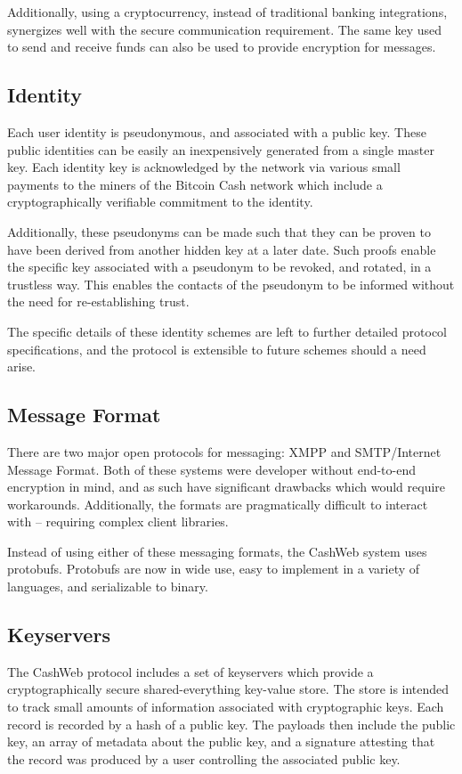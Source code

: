 \documentclass{article}
\theoremstyle{definition}
\begin{document}
Additionally, using a cryptocurrency, instead of traditional banking integrations, synergizes well with the secure communication requirement. The same key used to send and receive funds can also be used to provide encryption for messages.

\subsection{Identity}
Each user identity is pseudonymous, and associated with a public key.  These public identities can be easily an inexpensively generated from a single master key. Each identity key is acknowledged by the network via various small payments to the miners of the Bitcoin Cash network which include a cryptographically verifiable commitment to the identity.

Additionally, these pseudonyms can be made such that they can be proven to have been derived from another hidden key at a later date. Such proofs enable the specific key associated with a pseudonym to be revoked, and rotated, in a trustless way. This enables the contacts of the pseudonym to be informed without the need for re-establishing trust.

The specific details of these identity schemes are left to further detailed protocol specifications, and the protocol is extensible to future schemes should a need arise.

\subsection{Message Format}
There are two major open protocols for messaging: XMPP and SMTP/Internet Message Format. Both of these systems were developer without end-to-end encryption in mind, and as such have significant drawbacks which would require workarounds. Additionally, the formats are  pragmatically difficult to interact with -- requiring complex client libraries.

Instead of using either of these messaging formats, the CashWeb system uses protobufs. Protobufs are now in wide use, easy to implement in a variety of languages, and serializable to binary.

\subsection{Keyservers}
The CashWeb protocol includes a set of keyservers which provide a cryptographically secure shared-everything key-value store. The store is intended to track small amounts of information associated with cryptographic keys. Each record is recorded by a hash of a public key. The payloads then include the public key, an array of metadata about the public key, and a signature attesting that the record was produced by a user controlling the associated public key.
\end{document}
